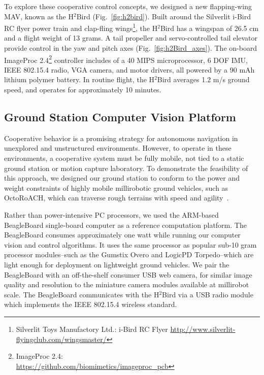 \documentclass{aamas2013}
\begin{document}
To explore these cooperative control concepts, we designed a new 
flapping-wing MAV, known as the H$^2$Bird (Fig.~\ref{fig:h2bird}). Built 
around the Silverlit i-Bird RC flyer power train and clap-fling wings\footnote{\raggedright Silverlit Toys Manufactory Ltd.: i-Bird RC Flyer
\href{http://www.silverlit-flyingclub.com/wingsmaster/}
     {http://www.silverlit-flyingclub.com/wingsmaster/}}, 
the H$^2$Bird has a wingspan of 26.5 cm and a flight weight of 13 grams. A 
tail propeller and servo-controlled tail elevator provide control in the yaw 
and pitch axes (Fig.~\ref{fig:h2Bird_axes}). The on-board ImageProc 2.4\footnote{ImageProc 2.4: \\
\href{https://github.com/biomimetics/imageproc\_pcb}
     {https://github.com/biomimetics/imageproc\_pcb}} 
controller includes of a 40 MIPS microprocessor, 6 DOF IMU, 
IEEE 802.15.4 radio, VGA camera, and motor drivers, all powered by a 90 mAh 
lithium polymer battery. In routine flight, the H$^2$Bird averages 1.2 m/s 
ground speed, and operates for approximately 10 minutes.

\subsection{Ground Station Computer Vision Platform}
Cooperative behavior is a promising strategy for autonomous navigation in 
unexplored and unstructured environments. However, to operate in these 
environments, a cooperative system must be fully mobile, not tied to a 
static ground station or motion capture laboratory. To demonstrate the 
feasibility of this approach, we designed our ground station to conform to 
the power and weight constraints of highly mobile millirobotic ground 
vehicles, such as OctoRoACH, which can traverse rough terrains with speed and 
agility~\cite{Pullin2012Dynamic}. 

Rather than power-intensive PC processors, we used the ARM-based BeagleBoard 
single-board computer as a reference computation platform. The BeagleBoard 
consumes approximately one watt while running our computer vision and 
control algorithms. It uses the same processor as popular sub-10 gram 
processor modules--such as the Gumstix Overo and LogicPD Torpedo--which are 
light enough for deployment on lightweight ground vehicles. We pair the 
BeagleBoard with an off-the-shelf consumer USB web camera, for similar image 
quality and resolution to the miniature camera modules available at 
millirobot scale. The BeagleBoard communicates with the H$^2$Bird via a 
USB radio module which implements the IEEE 802.15.4 wireless standard.
\end{document}
